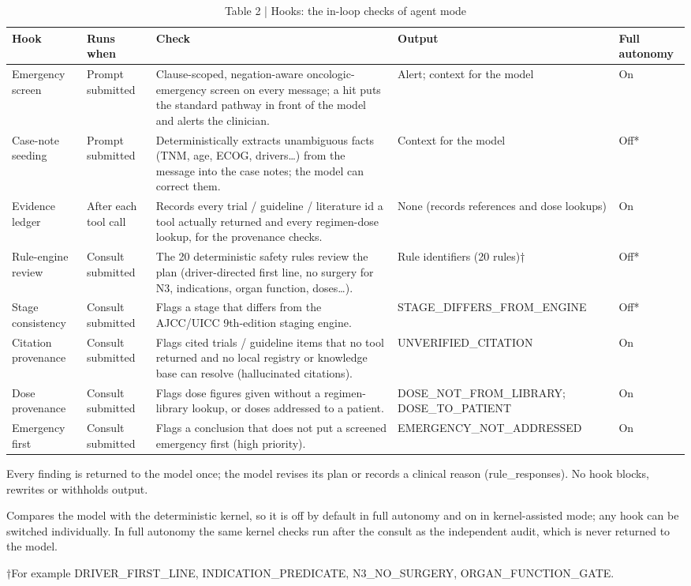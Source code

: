 \begin{table}[t]
\small
\caption{Table 2 | Hooks: the in-loop checks of agent mode}
\begin{tabular}{p{2.4cm}p{2.2cm}p{6.0cm}p{3.4cm}p{1.4cm}}
\toprule
Hook & Runs when & Check & Output & Full autonomy \\
\midrule
Emergency screen & Prompt submitted & Clause-scoped, negation-aware oncologic-emergency screen on every message; a hit puts the standard pathway in front of the model and alerts the clinician. & Alert; context for the model & On \\
Case-note seeding & Prompt submitted & Deterministically extracts unambiguous facts (TNM, age, ECOG, drivers…) from the message into the case notes; the model can correct them. & Context for the model & Off* \\
Evidence ledger & After each tool call & Records every trial / guideline / literature id a tool actually returned and every regimen-dose lookup, for the provenance checks. & None (records references and dose lookups) & On \\
Rule-engine review & Consult submitted & The 20 deterministic safety rules review the plan (driver-directed first line, no surgery for N3, indications, organ function, doses…). & Rule identifiers (20 rules)† & Off* \\
Stage consistency & Consult submitted & Flags a stage that differs from the AJCC/UICC 9th-edition staging engine. & STAGE\_DIFFERS\_FROM\_ENGINE & Off* \\
Citation provenance & Consult submitted & Flags cited trials / guideline items that no tool returned and no local registry or knowledge base can resolve (hallucinated citations). & UNVERIFIED\_CITATION & On \\
Dose provenance & Consult submitted & Flags dose figures given without a regimen-library lookup, or doses addressed to a patient. & DOSE\_NOT\_FROM\_LIBRARY; DOSE\_TO\_PATIENT & On \\
Emergency first & Consult submitted & Flags a conclusion that does not put a screened emergency first (high priority). & EMERGENCY\_NOT\_ADDRESSED & On \\
\bottomrule
\end{tabular}
\par\footnotesize Every finding is returned to the model once; the model revises its plan or records a clinical reason (rule\_responses). No hook blocks, rewrites or withholds output.
\par\footnotesize *Compares the model with the deterministic kernel, so it is off by default in full autonomy and on in kernel-assisted mode; any hook can be switched individually. In full autonomy the same kernel checks run after the consult as the independent audit, which is never returned to the model.
\par\footnotesize †For example DRIVER\_FIRST\_LINE, INDICATION\_PREDICATE, N3\_NO\_SURGERY, ORGAN\_FUNCTION\_GATE.
\end{table}
